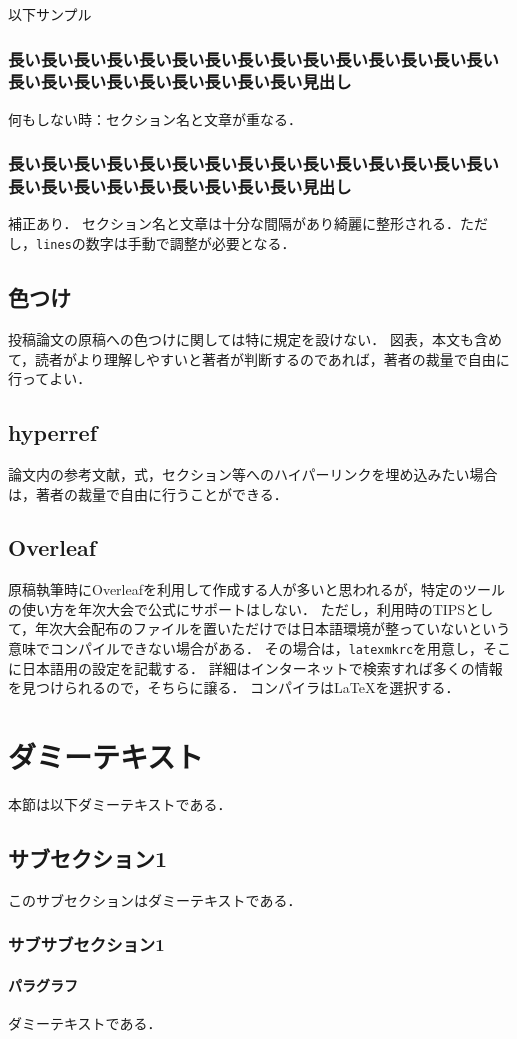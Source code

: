 \documentclass[
  platex, dvipdfmx,  %
]{nlp2025}
\newcommand{\code}[1]{\texttt{#1}}
\begin{document}
以下サンプル

\subsubsection{長い長い長い長い長い長い長い長い長い長い長い長い長い長い長い長い長い長い長い長い長い長い長い長い見出し}

何もしない時：セクション名と文章が重なる．


\subsubsection{長い長い長い長い長い長い長い長い長い長い長い長い長い長い長い長い長い長い長い長い長い長い長い長い見出し}
\restoresection

補正あり．
セクション名と文章は十分な間隔があり綺麗に整形される．ただし，\code{lines}の数字は手動で調整が必要となる．


\subsection{色つけ}
投稿論文の原稿への色つけに関しては特に規定を設けない．
図表，本文も含めて，読者がより理解しやすいと著者が判断するのであれば，著者の裁量で自由に行ってよい．

\subsection{hyperref}
論文内の参考文献，式，セクション等へのハイパーリンクを埋め込みたい場合は，著者の裁量で自由に行うことができる．


\subsection{Overleaf}
原稿執筆時にOverleafを利用して作成する人が多いと思われるが，特定のツールの使い方を年次大会で公式にサポートはしない．
ただし，利用時のTIPSとして，年次大会配布のファイルを置いただけでは日本語環境が整っていないという意味でコンパイルできない場合がある．
その場合は，\code{latexmkrc}を用意し，そこに日本語用の設定を記載する．
詳細はインターネットで検索すれば多くの情報を見つけられるので，そちらに譲る．
コンパイラはLaTeXを選択する．

\section{ダミーテキスト}
本節は以下ダミーテキストである．

\subsection{サブセクション1}
このサブセクションはダミーテキストである．

\subsubsection{サブサブセクション1}

\paragraph{パラグラフ}
ダミーテキストである．
\end{document}
